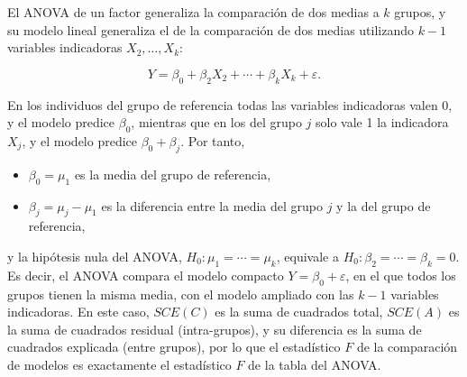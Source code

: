 \documentclass[
  spanish,
  a4paper,
]{scrreport}
\providecommand{\tightlist}{%
  \setlength{\itemsep}{0pt}\setlength{\parskip}{0pt}}
\theoremstyle{plain}
\theoremstyle{definition}
\theoremstyle{definition}
\theoremstyle{remark}
\begin{document}
El ANOVA de un factor generaliza la comparación de dos medias a \(k\)
grupos, y su modelo lineal generaliza el de la comparación de dos medias
utilizando \(k-1\) variables indicadoras \(X_2,\ldots,X_k\):

\[
Y = \beta_0 + \beta_2X_2 + \cdots + \beta_k X_k + \varepsilon.
\]

En los individuos del grupo de referencia todas las variables
indicadoras valen 0, y el modelo predice \(\beta_0\), mientras que en
los del grupo \(j\) solo vale 1 la indicadora \(X_j\), y el modelo
predice \(\beta_0+\beta_j\). Por tanto,

\begin{itemize}
\tightlist
\item
  \(\beta_0=\mu_1\) es la media del grupo de referencia,
\item
  \(\beta_j=\mu_j-\mu_1\) es la diferencia entre la media del grupo
  \(j\) y la del grupo de referencia,
\end{itemize}

y la hipótesis nula del ANOVA, \(H_0:\mu_1=\cdots=\mu_k\), equivale a
\(H_0:\beta_2=\cdots=\beta_k=0\). Es decir, el ANOVA compara el modelo
compacto \(Y=\beta_0+\varepsilon\), en el que todos los grupos tienen la
misma media, con el modelo ampliado con las \(k-1\) variables
indicadoras. En este caso, \(SCE(C)\) es la suma de cuadrados total,
\(SCE(A)\) es la suma de cuadrados residual (intra-grupos), y su
diferencia es la suma de cuadrados explicada (entre grupos), por lo que
el estadístico \(F\) de la comparación de modelos es exactamente el
estadístico \(F\) de la tabla del ANOVA.
\end{document}
